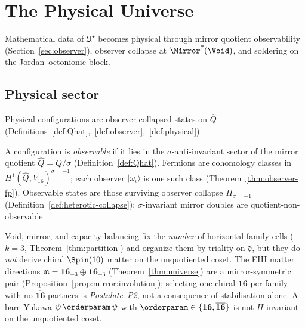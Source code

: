 \section{The Physical Universe}
\label{sec:physics}

Mathematical data of $\mathfrak{U}^\star$ becomes physical through mirror
quotient observability (Section~\ref{sec:observer}), observer collapse at
$\Mirror^7(\Void)$, and soldering on the Jordan--octonionic block.

\subsection{Physical sector}
\label{sec:physics:sector}

Physical configurations are observer-collapsed states on $\hat Q$
(Definitions~\ref{def:Qhat},~\ref{def:observer},~\ref{def:physical}).

\begin{definition}\label{def:physical}
A configuration is \emph{observable} if it lies in the $\sigma$-anti-invariant
sector of the mirror quotient $\hat Q=Q/\sigma$
(Definition~\ref{def:Qhat}). Fermions are cohomology classes in
$H^1(\hat Q,V_{16})^{\sigma=-1}$; each observer $|\omega_\iota\rangle$ is one
such class (Theorem~\ref{thm:observer-fp}). Observable states are those
surviving observer collapse $\Pi_{\sigma=-1}$
(Definition~\ref{def:heterotic-collapse}); $\sigma$-invariant mirror doubles
are quotient-non-observable.
\end{definition}

\begin{proposition}\label{prop:p2-nogo}
Void, mirror, and capacity balancing fix the \emph{number} of horizontal
family cells ($k=3$, Theorem~\ref{thm:partition}) and organize them by triality
on $\mathfrak{d}$, but they do \emph{not} derive chiral $\Spin(10)$ matter on
the unquotiented coset. The EIII matter directions
$\mathfrak{m}=\mathbf{16}_{-3}\oplus\overline{\mathbf{16}}_{+3}$
(Theorem~\ref{thm:universe}) are a mirror-symmetric pair
(Proposition~\ref{prop:mirror:involution}); selecting one chiral
$\mathbf{16}$ per family with no $\overline{\mathbf{16}}$ partners is
\emph{Postulate~P2}, not a consequence of stabilisation alone. A bare Yukawa
$\bar\psi\,\orderparam\,\psi$ with
$\orderparam\in\{\mathbf{16},\overline{\mathbf{16}}\}$ is not $H$-invariant on
the unquotiented coset.
\end{proposition}

